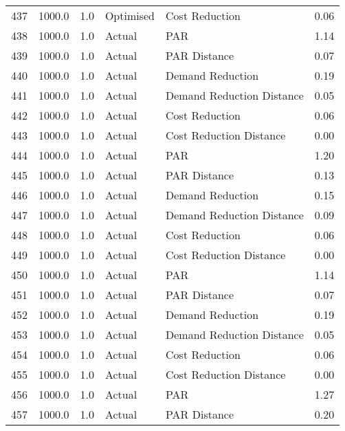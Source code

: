 \begin{longtable}{lrrllr}
437  &       1000.0 &     1.0 &      Optimised &             Cost Reduction &   0.06 \\
438  &       1000.0 &     1.0 &         Actual &                        PAR &   1.14 \\
439  &       1000.0 &     1.0 &         Actual &               PAR Distance &   0.07 \\
440  &       1000.0 &     1.0 &         Actual &           Demand Reduction &   0.19 \\
441  &       1000.0 &     1.0 &         Actual &  Demand Reduction Distance &   0.05 \\
442  &       1000.0 &     1.0 &         Actual &             Cost Reduction &   0.06 \\
443  &       1000.0 &     1.0 &         Actual &    Cost Reduction Distance &   0.00 \\
444  &       1000.0 &     1.0 &         Actual &                        PAR &   1.20 \\
445  &       1000.0 &     1.0 &         Actual &               PAR Distance &   0.13 \\
446  &       1000.0 &     1.0 &         Actual &           Demand Reduction &   0.15 \\
447  &       1000.0 &     1.0 &         Actual &  Demand Reduction Distance &   0.09 \\
448  &       1000.0 &     1.0 &         Actual &             Cost Reduction &   0.06 \\
449  &       1000.0 &     1.0 &         Actual &    Cost Reduction Distance &   0.00 \\
450  &       1000.0 &     1.0 &         Actual &                        PAR &   1.14 \\
451  &       1000.0 &     1.0 &         Actual &               PAR Distance &   0.07 \\
452  &       1000.0 &     1.0 &         Actual &           Demand Reduction &   0.19 \\
453  &       1000.0 &     1.0 &         Actual &  Demand Reduction Distance &   0.05 \\
454  &       1000.0 &     1.0 &         Actual &             Cost Reduction &   0.06 \\
455  &       1000.0 &     1.0 &         Actual &    Cost Reduction Distance &   0.00 \\
456  &       1000.0 &     1.0 &         Actual &                        PAR &   1.27 \\
457  &       1000.0 &     1.0 &         Actual &               PAR Distance &   0.20 \\

\end{longtable}
